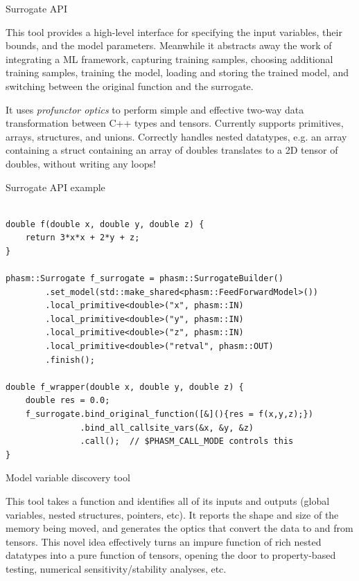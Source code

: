 \documentclass[final]{beamer}
\newlength{\onecolwid}
\begin{document}
\begin{frame}[fragile,t]
\begin{columns}[t]
\begin{column}{\onecolwid} %




\begin{block}{Surrogate API}

This tool provides a high-level interface for specifying the input variables, their bounds, and the model parameters. Meanwhile it abstracts away the work of integrating a ML framework, capturing training samples, choosing additional training samples, training the model, loading and storing the trained model, and switching between the original function and the surrogate. 

It uses \emph{profunctor optics} to perform simple and effective two-way data transformation between C++ types and tensors. Currently supports primitives, arrays, structures, and unions. Correctly handles nested datatypes, e.g. an array containing a struct containing an array of doubles translates to a 2D tensor of doubles, without writing any loops!

\end{block}



\begin{block}{Surrogate API example}
\begin{verbatim}

double f(double x, double y, double z) {
    return 3*x*x + 2*y + z;
}

phasm::Surrogate f_surrogate = phasm::SurrogateBuilder()
        .set_model(std::make_shared<phasm::FeedForwardModel>())
        .local_primitive<double>("x", phasm::IN)
        .local_primitive<double>("y", phasm::IN)
        .local_primitive<double>("z", phasm::IN)
        .local_primitive<double>("retval", phasm::OUT)
        .finish();

double f_wrapper(double x, double y, double z) {
    double res = 0.0;
    f_surrogate.bind_original_function([&](){res = f(x,y,z);})
               .bind_all_callsite_vars(&x, &y, &z)
               .call();  // $PHASM_CALL_MODE controls this
}
\end{verbatim}
\end{block}


\begin{block}{Model variable discovery tool}

This tool takes a function and identifies all of its inputs and outputs (global variables, nested structures, pointers, etc).
It reports the shape and size of the memory being moved, and generates the optics that convert the data to and from tensors. This novel idea effectively turns an impure function of rich nested datatypes into a pure function of tensors, opening the door to property-based testing, numerical sensitivity/stability analyses, etc.



\end{block}
\end{column}
\end{columns}
\end{frame}
\end{document}
